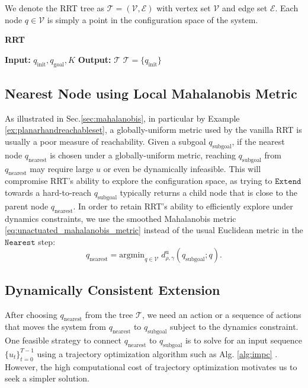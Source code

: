 We denote the RRT tree as $\mathcal{T}=(\mathcal{V},\mathcal{E})$ with vertex set $\mathcal{V}$ and edge set $\mathcal{E}$. Each node $q \in \mathcal{V}$ is simply a point in the configuration space of the system. 


\begin{algorithm}[t]
\caption{\textbf{RRT}}\label{alg:rrt}
\textbf{Input:} $q_{\mathrm{init}}, q_{\mathrm{goal}}, K$\;
\textbf{Output:} $\mathcal{T}$\;
$\mathcal{T} = \{q_{\mathrm{init}}\}$\;
\end{algorithm}


\subsection{Nearest Node using Local Mahalanobis Metric}
As illustrated in Sec.\ref{sec:mahalanobis}, in particular by Example \ref{ex:planarhandreachableset}, a globally-uniform metric used by the vanilla RRT is usually a poor measure of reachability. Given a subgoal $q_{\mathrm{subgoal}}$, if the nearest node $q_{\mathrm{nearest}}$ is chosen under a globally-uniform metric, reaching $q_{\mathrm{subgoal}}$ from $q_{\mathrm{nearest}}$ may require large $u$ or even be dynamically infeasible. This will compromise RRT's ability to explore the configuration space, as trying to $\mathtt{Extend}$ towards a hard-to-reach $q_{\mathrm{subgoal}}$ typically returns a child node that is close to the parent node $q_{\mathrm{nearest}}$. In order to retain RRT's ability to efficiently explore under dynamics constraints, we use the smoothed Mahalanobis metric \eqref{eq:unactuated_mahalanobis_metric} instead of the usual Euclidean metric in the $\mathtt{Nearest}$ step:
\begin{equation}
q_{\mathrm{nearest}} = \text{argmin}_{q \in \mathcal{V}}\; d^{\mathrm{u}}_{\rho,\gamma}(q_{\mathrm{subgoal}}; q).
\end{equation}

\subsection{Dynamically Consistent Extension}
After choosing $q_{\mathrm{nearest}}$ from the tree $\mathcal{T}$, we need an action or a sequence of actions that moves the system from $q_{\mathrm{nearest}}$ to $q_{\mathrm{subgoal}}$ subject to the dynamics constraint. One feasible strategy to connect $q_{\mathrm{nearest}}$ to $q_{\mathrm{subgoal}}$ is to solve for an input sequence $\{u_t\}_{t=0}^{T-1}$ using a trajectory optimization algorithm such as Alg. \ref{alg:impc} \cite{karaman2010optimal}. However, the high computational cost of trajectory optimization motivates us to seek a simpler solution.

